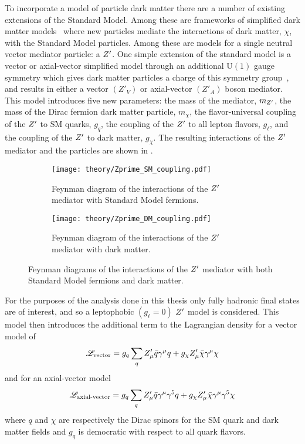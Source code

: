 To incorporate a model of particle dark matter there are a number of existing extensions of the Standard Model.
Among these are frameworks of simplified dark matter models~\cite{EXOT-2017-32,Jacques:2016dqz,Kahlhoefer:2015bea,Alves:2015pea} where new particles mediate the interactions of dark matter, $\chi$, with the Standard Model particles.
Among these are models for a single neutral vector mediator particle: a $\Zprime$.
One simple extension of the standard model is a vector or axial-vector simplified model through an additional $\mathrm{U}(1)$ gauge symmetry which gives dark matter particles a charge of this symmetry group~\cite{Abercrombie:2015wmb}, and results in either a vector $\left(Z'_{V}\right)$ or axial-vector $\left(Z'_{A}\right)$ boson mediator.
This model introduces five new parameters: the mass of the mediator, $m_{Z^{\prime}}$, the mass of the Dirac fermion dark matter particle, $m_{\chi}$, the flavor-universal coupling of the $\Zprime$ to SM quarks, $g_{q}$, the coupling of the $\Zprime$ to all lepton flavors, $g_{\ell}$, and the coupling of the $\Zprime$ to dark matter, $g_{\chi}$.
The resulting interactions of the $\Zprime$ mediator and the particles are shown in .

\begin{figure}[htbp]
 \centering
 \begin{subfigure}[t]{0.48\textwidth}
  \centering
  \texttt{[image: theory/Zprime\_SM\_coupling.pdf]}
  \caption[Feynman diagram of the interactions of the $\Zprime$ mediator with Standard Model fermions.]{%
   Feynman diagram of the interactions of the $\Zprime$ mediator with Standard Model fermions.}
  \label{fig:Zprime_SM_coupling}
 \end{subfigure}%
 \quad
 \begin{subfigure}[t]{0.48\textwidth}
  \centering
  \texttt{[image: theory/Zprime\_DM\_coupling.pdf]}
  \caption[Feynman diagram of the interactions of the $\Zprime$ mediator with dark matter.]{%
   Feynman diagram of the interactions of the $\Zprime$ mediator with dark matter.}
  \label{fig:Zprime_DM_coupling}
 \end{subfigure}%
 \caption[Feynman diagrams of the interactions of the $\Zprime$ mediator with both Standard Model fermions and dark matter.]{%
  Feynman diagrams of the interactions of the $\Zprime$ mediator with both Standard Model fermions and dark matter.}
 \label{fig:Zprime_interactions}
\end{figure}

For the purposes of the analysis done in this thesis only fully hadronic final states are of interest, and so a leptophobic $\left(g_{\ell}=0\right)$ $\Zprime$ model is considered.
This model then introduces the additional term to the Lagrangian density for a vector model of
\[
 \mathscr{L}_{\textrm{vector}} = g_{q} \sum_{q} Z^{\prime}_{\mu} \bar{q} \gamma^{\mu} q + g_{\chi} Z^{\prime}_{\mu} \bar{\chi} \gamma^{\mu} \chi
\]
and for an axial-vector model
\[
 \mathscr{L}_{\textrm{axial-vector}} = g_{q} \sum_{q} Z^{\prime}_{\mu} \bar{q} \gamma^{\mu}\gamma^{5} q + g_{\chi} Z^{\prime}_{\mu} \bar{\chi} \gamma^{\mu}\gamma^{5} \chi
\]
where $q$ and $\chi$ are respectively the Dirac spinors for the SM quark and dark matter fields and $g_{q}$ is democratic with respect to all quark flavors.

